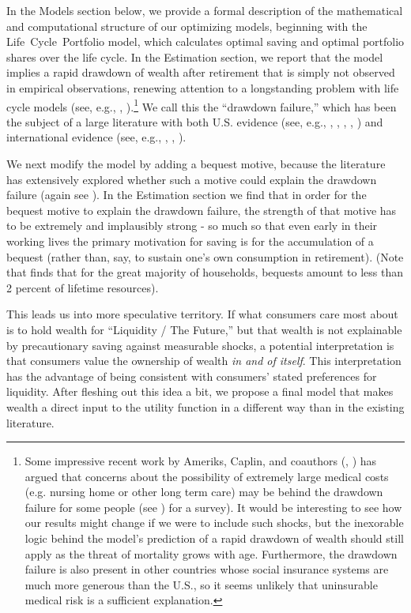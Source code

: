 \documentclass{article}
\begin{document}
In the Models section below, we provide a formal description of the mathematical and computational structure of our optimizing models, beginning with the Life~Cycle~Portfolio model, which calculates optimal saving and optimal portfolio shares over the life cycle.
In the Estimation section, we report that the model implies a rapid drawdown of wealth after retirement that is simply not observed in empirical observations, renewing attention to a longstanding problem with life cycle models (see, e.g., \cite{hurd1987savings}, \cite{HEIMER_2019}).\footnote{Some impressive recent work by Ameriks, Caplin, and coauthors (\cite{ameriks2011joy}, \cite{Ameriks2020jpe}) has argued that concerns about the possibility of extremely large medical costs (e.g. nursing home or other long term care) may be behind the drawdown failure for some people (see \cite{DeNardi2016d}) for a survey).
It would be interesting to see how our results might change if we were to include such shocks, but the inexorable logic behind the model's prediction of a rapid drawdown of wealth should still apply as the threat of mortality grows with age.
Furthermore, the drawdown failure is also present in other countries whose social insurance systems are much more generous than the U.S., so it seems unlikely that uninsurable medical risk is a sufficient explanation.}
We call this the ``drawdown failure,'' which has been the subject of a large literature with both U.S. evidence (see, e.g., \cite{Hurd_1989}, \cite{DeNardi2016d}, \cite{Kopecky_2014}, \cite{Mortenson_2019}, \cite{Poterba_2018}) and international evidence (see, e.g., \cite{Christensen_2022}, \cite{Ventura_2020}, \cite{Niimi_2019}).

We next modify the model by adding a bequest motive, because the literature has extensively explored whether such a motive could explain the drawdown failure (again see \cite{DeNardi2016d}).
In the Estimation section we find that in order for the bequest motive to explain the drawdown failure, the strength of that motive has to be extremely and implausibly strong - so much so that even early in their working lives the primary motivation for saving is for the accumulation of a bequest (rather than, say, to sustain one's own consumption in retirement). (Note that \cite{Hendricks_2002} finds that for the great majority of households, bequests amount to less than 2 percent of lifetime resources).

This leads us into more speculative territory.
If what consumers care most about is to hold wealth for ``Liquidity / The Future,'' but that wealth is not explainable by precautionary saving against measurable shocks, a potential interpretation is that consumers value the ownership of wealth \textit{in and of itself}. This interpretation has the advantage of being consistent with consumers' stated preferences for liquidity.
After fleshing out this idea a bit, we propose a final model that makes wealth a direct input to the utility function in a different way than in the existing literature.
\end{document}
